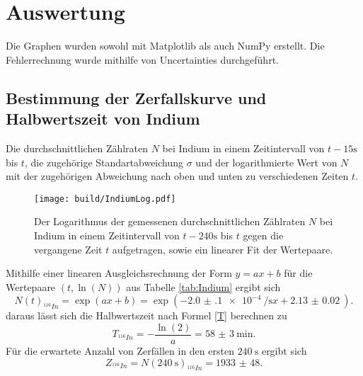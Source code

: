 \section{Auswertung}
\label{sec:Auswertung}


Die Graphen wurden sowohl mit Matplotlib \cite{matplotlib} als auch NumPy \cite{numpy} erstellt. Die
Fehlerrechnung wurde mithilfe von Uncertainties \cite{uncertainties} durchgeführt.


\subsection{Bestimmung der Zerfallskurve und Halbwertszeit von Indium}
 \begin{table}
  \centering
  \caption{Die durchschnittlichen Zählraten $N$ bei Indium in einem Zeitintervall von $t-15\si{\second}$ bis $t$, die zugehörige Standartabweichung $\sigma$ und der logarithmierte Wert von $N$ mit der zugehörigen Abweichung nach oben und unten zu verschiedenen Zeiten $t$.}
  
 \end{table}
\begin{figure}
	\centering
	\caption{Der Logarithmus der gemessenen durchschnittlichen Zählraten $N$ bei Indium in einem Zeitintervall von $t-240\si{\second}$ bis $t$ gegen die vergangene Zeit $t$ aufgetragen, sowie ein linearer Fit der Wertepaare.}
	\texttt{[image: build/IndiumLog.pdf]}
	\label{fig:Indium}
\end{figure}
Mithilfe einer linearen Ausgleichsrechnung der Form $y=a x + b$ für die Wertepaare $(t, \ln(N))$ aus Tabelle \ref{tab:Indium} ergibt sich
\begin{equation}
	N(t)_{^{116}In}=\exp\left(a x + b\right)=\exp\left(\SI{-2.0(1)e-4}{\per\second} x + \SI{2.13(2)}{}\right)\text{.}
\end{equation}
daraus lässt sich die Halbwertszeit nach Formel \eqref{T} berechnen zu
\begin{equation}
	T_{^{116}In}=-\frac{\ln(2)}{a}=\SI{58(3)}{\minute}\text{.}
\end{equation}
Für die erwartete Anzahl von Zerfällen in den ersten $\SI{240}{\second}$ ergibt sich
\begin{equation}
	Z_{^{116}In} = N(\SI{240}{\second})_{^{116}In}=\num{1933(48)}\text{.}
\end{equation}


